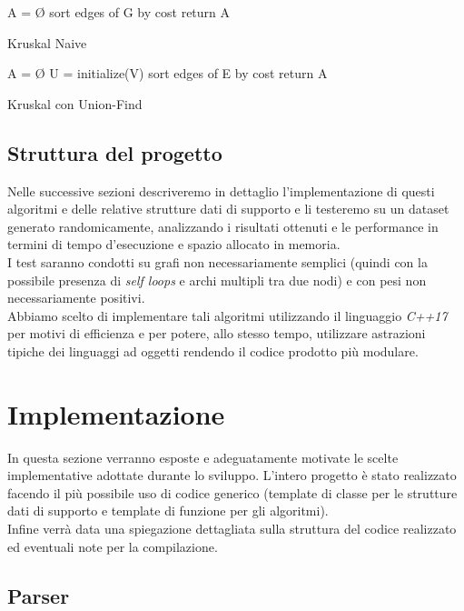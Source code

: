 \documentclass[]{article}
\begin{document}
\begin{algorithm}[H]
	\SetAlgoLined
	\DontPrintSemicolon
	A = Ø\;
	sort edges of G by cost\;
	return A\;
	\caption{Kruskal Naive}
\end{algorithm}

\begin{algorithm}[H]
	\SetAlgoLined
	\DontPrintSemicolon
	A = Ø\;
	U = initialize(V)\;
	sort edges of E by cost\;
	return A\;
	\caption{Kruskal con Union-Find}
\end{algorithm}
\subsection{Struttura del progetto}
Nelle successive sezioni descriveremo in dettaglio l'implementazione di questi algoritmi e delle relative strutture dati di supporto e li testeremo su un dataset generato randomicamente, analizzando i risultati ottenuti e le performance in termini di tempo d'esecuzione e spazio allocato in memoria.\\
I test saranno condotti su grafi non necessariamente semplici (quindi con la possibile presenza di \textit{self loops} e archi multipli tra due nodi) e con pesi non necessariamente positivi.\\
Abbiamo scelto di implementare tali algoritmi utilizzando il linguaggio \textit{C++17} per motivi di efficienza e per potere, allo stesso tempo, utilizzare astrazioni tipiche dei linguaggi ad oggetti rendendo il codice prodotto più modulare.
\section{Implementazione}
In questa sezione verranno esposte e adeguatamente motivate le scelte implementative adottate durante lo sviluppo. L'intero progetto è stato realizzato facendo il più possibile uso di codice generico (template di classe per le strutture dati di supporto e template di funzione per gli algoritmi).\\
Infine verrà data una spiegazione dettagliata sulla struttura del codice realizzato ed eventuali note per la compilazione.
\subsection{Parser}
\end{document}
